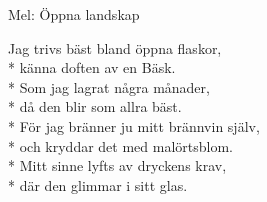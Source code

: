 \begin{SongText}
    \begin{SongInfo}
        Mel: Öppna landskap
    \end{SongInfo}
    \begin{SongVerse}
        Jag trivs bäst bland öppna flaskor,\\*%
        känna doften av en Bäsk.\\*%
        Som jag lagrat några månader,\\*%
        då den blir som allra bäst.\\*%
        För jag bränner ju mitt brännvin själv,\\*%
        och kryddar det med malörtsblom.\\*%
        Mitt sinne lyfts av dryckens krav,\\*%
        där den glimmar i sitt glas.
    \end{SongVerse}
\end{SongText}
